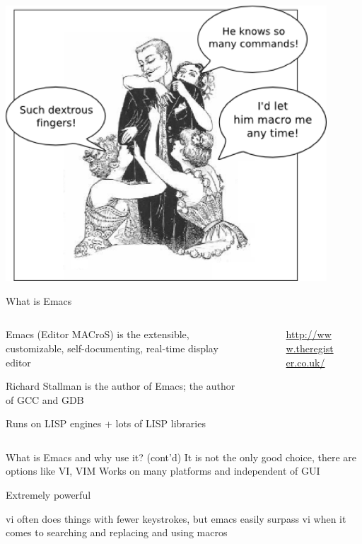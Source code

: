 \documentclass[newPxFont,sthlmFooter,nooffset]{beamer}
\begin{document}
\begin{frame}[t]{}
\centering
\includegraphics[width=0.9\textwidth]{./figure/emacs_dex.png}
\end{frame}


\begin{frame}[t]{What is Emacs}
\vspace{-1.5em}
\begin{columns}
\begin{column}{.7\linewidth}
Emacs (Editor MACroS) is the extensible, customizable, self-documenting, real-time display editor

\bigskip
Richard Stallman is the author of Emacs; the author of GCC and GDB

\bigskip
Runs on LISP engines + lots of LISP libraries
\end{column}
\begin{column}{.3\linewidth}
\begin{figure}\centering
   {\href{https://regmedia.co.uk/2012/06/12/richard_stallman.jpg}{http://www.theregister.co.uk/}}
\end{figure}
\end{column}
\end{columns}
\end{frame}

\begin{frame}[t]{What is Emacs and why use it? (cont'd)}
It is not the only good choice, there are options like VI, VIM Works on many platforms and independent of GUI

\bigskip
Extremely powerful

\bigskip
vi often does things with fewer keystrokes, but emacs easily surpass vi when it comes to searching and replacing and using macros

\end{frame}
\end{document}
